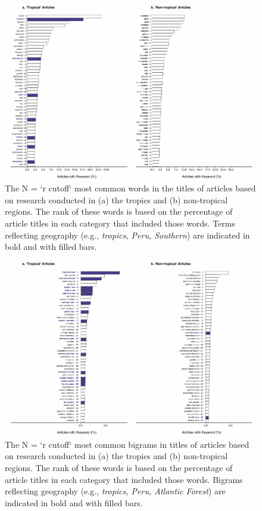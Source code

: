 \documentclass[
  12pt,
  man, donotrepeattitle,floatsintext]{apa6}
\begin{document}
\begin{figure}[H]

{\centering \includegraphics[width=0.9\linewidth,height=0.9\textheight,]{Bruna_plenary_MS_files/figure-latex/titlewords-1} 

}

\caption{The N = `r cutoff` most common words in the titles of articles based on research conducted in (a) the tropics and (b) non-tropical regions. The rank of these words is based on the percentage of article titles in each category that included those words. Terms reflecting geography (e.g., \textit{tropics, Peru, Southern}) are indicated in bold and with filled bars.}\label{fig:titlewords}
\end{figure}

\newpage

\begin{figure}[H]

{\centering \includegraphics[width=0.9\linewidth,height=0.9\textheight,]{Bruna_plenary_MS_files/figure-latex/bigrams-1} 

}

\caption{The N = `r cutoff` most common bigrams in titles of articles based on research conducted in (a) the tropics and (b) non-tropical regions. The rank of these words is based on the percentage of article titles in each category that included those words. Bigrams reflecting geography (e.g., \textit{tropics, Peru, Atlantic Forest}) are indicated in bold and with filled bars.}\label{fig:bigrams}
\end{figure}
\end{document}
